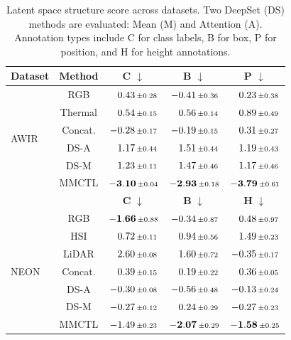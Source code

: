 \documentclass[lettersize,journal]{IEEEtran}
\begin{document}
\begin{table}[t]
\centering
\caption{
Latent space structure score across datasets. Two DeepSet (DS) methods are evaluated: Mean (M) and Attention (A). Annotation types include C for class labels, B for box, P for position, and H for height annotations.
}
\label{tab:latent_alignment}
\begin{tabular}{l c c c c}
\toprule
\textbf{Dataset} & \textbf{Method} 
& \textbf{C} $\downarrow$
& \textbf{B} $\downarrow$
& \textbf{P} $\downarrow$ \\
\midrule
\multirow{6}{*}{AWIR}
& RGB           
& $\phantom{-}0.43\,\scriptstyle\pm\,\!0.28$ 
& $-0.41\,\scriptstyle\pm\,\!0.36$ 
& $\phantom{-}0.23\,\scriptstyle\pm\,\!0.38$ \\
& Thermal       
& $\phantom{-}0.54\,\scriptstyle\pm\,\!0.15$ 
& $\phantom{-}0.56\,\scriptstyle\pm\,\!0.14$ 
& $\phantom{-}0.89\,\scriptstyle\pm\,\!0.49$ \\
\cmidrule(lr){2-5}
& Concat. 
& $-0.28\,\scriptstyle\pm\,\!0.17$ 
& $-0.19\,\scriptstyle\pm\,\!0.15$ 
& $\phantom{-}0.31\,\scriptstyle\pm\,\!0.27$ \\
& DS-A     
& $\phantom{-}1.17\,\scriptstyle\pm\,\!0.44$ 
& $\phantom{-}1.51\,\scriptstyle\pm\,\!0.44$ 
& $\phantom{-}1.19\,\scriptstyle\pm\,\!0.43$ \\
& DS-M       
& $\phantom{-}1.23\,\scriptstyle\pm\,\!0.11$ 
& $\phantom{-}1.47\,\scriptstyle\pm\,\!0.46$ 
& $\phantom{-}1.17\,\scriptstyle\pm\,\!0.46$ \\
\cmidrule(lr){2-5}
& MMCTL         
& $\mathbf{-3.10}\,\scriptstyle\pm\,\!0.04$ 
& $\mathbf{-2.93}\,\scriptstyle\pm\,\!0.18$ 
& $\mathbf{-3.79}\,\scriptstyle\pm\,\!0.61$ \\
\midrule
\multicolumn{2}{l}{}
& \textbf{C} $\downarrow$
& \textbf{B} $\downarrow$
& \textbf{H} $\downarrow$ \\
\midrule
\multirow{7}{*}{NEON}
& RGB           
& $\mathbf{-1.66}\,\scriptstyle\pm\,\!0.88$ 
& $-0.34\,\scriptstyle\pm\,\!0.87$ 
& $\phantom{-}0.48\,\scriptstyle\pm\,\!0.97$ \\
& HSI           
& $\phantom{-}0.72\,\scriptstyle\pm\,\!0.11$ 
& $\phantom{-}0.94\,\scriptstyle\pm\,\!0.56$ 
& $\phantom{-}1.49\,\scriptstyle\pm\,\!0.23$ \\
& LiDAR         
& $\phantom{-}2.60\,\scriptstyle\pm\,\!0.08$ 
& $\phantom{-}1.60\,\scriptstyle\pm\,\!0.72$ 
& $-0.35\,\scriptstyle\pm\,\!0.17$ \\
\cmidrule(lr){2-5}
& Concat. 
& $\phantom{-}0.39\,\scriptstyle\pm\,\!0.15$ 
& $\phantom{-}0.19\,\scriptstyle\pm\,\!0.22$ 
& $\phantom{-}0.36\,\scriptstyle\pm\,\!0.05$ \\
& DS-A     
& $-0.30\,\scriptstyle\pm\,\!0.08$ 
& $-0.56\,\scriptstyle\pm\,\!0.48$ 
& $-0.13\,\scriptstyle\pm\,\!0.24$ \\
& DS-M       
& $-0.27\,\scriptstyle\pm\,\!0.12$ 
& $\phantom{-}0.24\,\scriptstyle\pm\,\!0.29$ 
& $-0.27\,\scriptstyle\pm\,\!0.23$ \\
\cmidrule(lr){2-5}
& MMCTL         
& $-1.49\,\scriptstyle\pm\,\!0.23$ 
& $\mathbf{-2.07}\,\scriptstyle\pm\,\!0.29$ 
& $\mathbf{-1.58}\,\scriptstyle\pm\,\!0.25$ \\
\bottomrule
\end{tabular}
\end{table}
\end{document}
